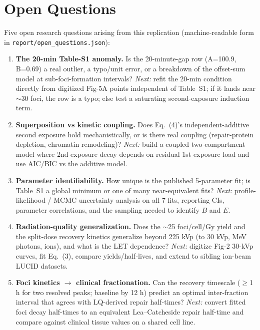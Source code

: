 \section*{Open Questions}
Five open research questions arising from this replication (machine-readable form in
\texttt{report/open\_questions.json}):

\begin{enumerate}
\item[\textbf{Q1}] \textbf{The 20-min Table-S1 anomaly.} Is the 20-minute-gap row
(A=100.9, B=0.69) a real outlier, a typo/unit error, or a breakdown of the
offset-sum model at sub-foci-formation intervals? \emph{Next:} refit the 20-min
condition directly from digitized Fig-5A points independent of Table~S1; if it
lands near $\sim$30 foci, the row is a typo; else test a saturating second-exposure
induction term.

\item[\textbf{Q2}] \textbf{Superposition vs kinetic coupling.} Does Eq.~(4)'s
independent-additive second exposure hold mechanistically, or is there real coupling
(repair-protein depletion, chromatin remodeling)? \emph{Next:} build a coupled
two-compartment model where 2nd-exposure decay depends on residual 1st-exposure load
and use AIC/BIC vs the additive model.

\item[\textbf{Q3}] \textbf{Parameter identifiability.} How unique is the published
5-parameter fit; is Table~S1 a global minimum or one of many near-equivalent fits?
\emph{Next:} profile-likelihood / MCMC uncertainty analysis on all 7 fits, reporting
CIs, parameter correlations, and the sampling needed to identify $B$ and $E$.

\item[\textbf{Q4}] \textbf{Radiation-quality generalization.} Does the
$\sim$25 foci/cell/Gy yield and the split-dose recovery kinetics generalize beyond
225 kVp (to 30 kVp, MeV photons, ions), and what is the LET dependence?
\emph{Next:} digitize Fig-2 30-kVp curves, fit Eq.~(3), compare yields/half-lives,
and extend to sibling ion-beam LUCID datasets.

\item[\textbf{Q5}] \textbf{Foci kinetics $\to$ clinical fractionation.} Can the
recovery timescale ($\ge$1 h for two resolved peaks; baseline by 12 h) predict an
optimal inter-fraction interval that agrees with LQ-derived repair half-times?
\emph{Next:} convert fitted foci decay half-times to an equivalent Lea--Catcheside
repair half-time and compare against clinical tissue values on a shared cell line.
\end{enumerate}
